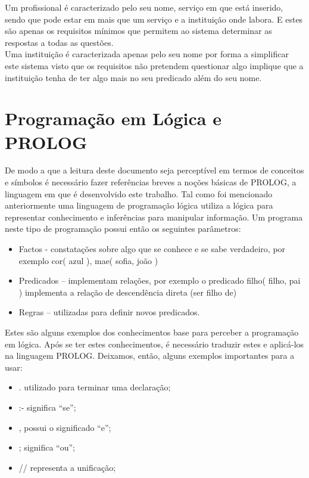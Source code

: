 Um profissional é caracterizado pelo seu nome, serviço em que está inserido, sendo que pode estar em mais que um serviço e a instituição onde labora. E estes são apenas os requisitos mínimos que permitem ao sistema determinar as respostas a todas as questões.
\\

Uma instituição é caracterizada apenas pelo seu nome por forma a simplificar este sistema visto que os requisitos não pretendem questionar algo implique que a instituição tenha de ter algo mais no seu predicado além do seu nome.


\section{Programação em Lógica e PROLOG}
\label{p2:proglogprolog}
De modo a que a leitura deste documento seja perceptível em termos de conceitos e símbolos é necessário fazer referências breves a noções básicas de PROLOG, a linguagem em que é desenvolvido este trabalho.
Tal como foi mencionado anteriormente uma linguagem de programação lógica utiliza a lógica para representar conhecimento e inferências para manipular informação. Um programa neste tipo de programação possui então os seguintes parâmetros:

\begin{itemize}
	\item Factos - constatações sobre algo que se conhece e se sabe verdadeiro, por exemplo cor( azul ), mae( sofia, joão )
	\item Predicados – implementam relações, por exemplo o predicado filho( filho, pai ) implementa a relação de descendência direta (ser filho de)
	\item Regras – utilizadas para definir novos predicados. 
\end{itemize}

Estes são alguns exemplos dos conhecimentos base para perceber a programação em lógica.
Após se ter estes conhecimentos, é necessário traduzir estes e aplicá-los na linguagem PROLOG.
Deixamos, então, alguns exemplos importantes para a usar:

\begin{itemize}
	\item .  utilizado para terminar uma declaração;
	\item :-  significa “se”;
	\item ,  possui o significado “e”;
	\item ;  significa “ou”;
	\item //  representa a unificação;
\end{itemize}

